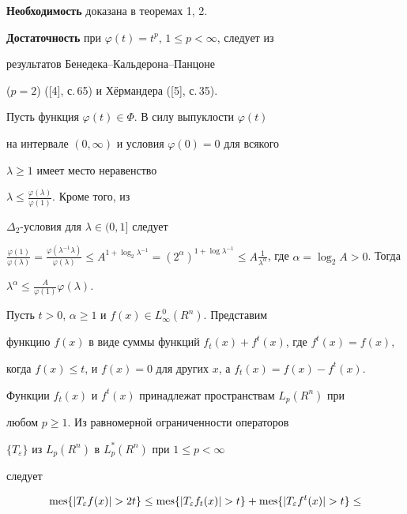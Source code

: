 \begin{pf} 


{\bf Необходимость} доказана в теоремах 1, 2. 


 


{\bf Достаточность} при $\varphi(t)=t^p$, $1\le p<\infty$, следует из 


результатов Бенедека--Кальдерона--Панцоне 


($p=2$) ([4], с.\,65) и Х\"ермандера ([5], с.\,35). 


Пусть функция $\varphi(t)\in\Phi$. В силу выпуклости $\varphi(t)$ 


на интервале $(0,\infty)$ и условия $\varphi(0)=0$ для всякого 


$\lambda\ge1$ имеет место неравенство 


$\lambda\le\frac{\varphi(\lambda)}{\varphi(1)}$. Кроме того, из 


$\Delta_2$-условия для $\lambda\in(0,1]$ следует 


$\frac{\varphi(1)}{\varphi(\lambda)}= 


\frac{\varphi(\lambda^{-1}\lambda)}{\varphi(\lambda)}\le 


A^{1+\log_2\lambda^{-1}}= (2^\alpha)^{1+\log\lambda^{-1}}\le 


A\frac{1}{\lambda^\alpha}$, где $\alpha=\log_2A>0$. Тогда 


$\lambda^\alpha\le\frac{A}{\varphi(1)}\varphi(\lambda)$. 


Пусть $t>0$, $\alpha\ge1$ и $f(x)\in L^0_\infty(R^n)$. Представим 


функцию $f(x)$ в виде суммы функций $f_t(x)+f^t(x)$, где $f^t(x)=f(x)$, 


когда $f(x)\le t$, и $f(x)=0$ для других $x$, а $f_t(x)=f(x)-f^t(x)$. 


Функции $f_t(x)$ и $f^t(x)$ принадлежат пространствам $L_p(R^n)$ при 


любом $p\ge1$. Из равномерной ограниченности операторов 


$\{T_\varepsilon\}$ из $L_p(R^n)$ в $L^*_p(R^n)$ при $1\le p<\infty$ 


следует 


\begin{multline*} 


\mes\{|T_\varepsilon f(x)|>2t\}\le\mes 


\{|T_\varepsilon f_t(x)|>t\}+\mes \{|T_\varepsilon 


f^t(x)|>t\}\le \\ 



\end{multline*}
\end{pf}

